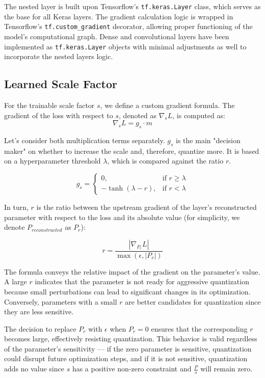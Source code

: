 The nested layer is built upon Tensorflow's \texttt{tf.keras.Layer} class,
which serves as the base for all Keras layers. The gradient calculation logic is wrapped
in Tensorflow's \texttt{tf.custom\_gradient} decorator, allowing proper functioning of the 
model's computational graph. Dense and convolutional layers have been implemented as 
\texttt{tf.keras.Layer} objects with minimal adjustments as well to incorporate the nested layers logic.


\subsection{Learned Scale Factor}
\label{subsec:learnedscalefactor}

\hspace*{1em}For the trainable scale factor \( s \), we define a custom gradient formula. 
The gradient of the loss with respect to \( s \), denoted as \( \nabla_s L \), is computed as:
\[
\nabla_s L = g_s \cdot m
\]

Let's consider both multiplication terms separately. \(  g_s  \) is the main "decision maker" on whether to
increase the scale and, therefore, quantize more. It is based on a hyperparameter threshold  \(  \lambda  \),
which is compared against the ratio \(  r  \).

\[
g_s = 
\begin{cases} 
0, & \text{if } r \geq \lambda \\
- \tanh(\lambda - r), & \text{if } r < \lambda
\end{cases}
\]

In turn, \(  r  \) is the ratio between the upstream gradient of the layer's reconstructed parameter with respect to the loss
and its absolute value (for simplicity, we denote \( P_{reconstructed}\) as \(P_r\)):

\[
r = \frac{\left| \nabla_{P_{r}} L \right|}{\max(\epsilon, \left| P_r \right|)}
\]

The formula conveys the relative impact of the gradient on the parameter's value.
A large \(  r  \) indicates that the parameter is not ready for aggressive quantization
because small perturbations can lead to significant changes in its optimization.
Conversely, parameters with a small \(  r  \) are better candidates
for quantization since they are less sensitive.

The decision to replace \( P_r \) with \( \epsilon \) when \( P_r = 0 \)
ensures that the corresponding \( r \) becomes large,
effectively resisting quantization. This behavior is valid regardless of the parameter's sensitivity
 — if the zero parameter is sensitive, quantization could disrupt future optimization steps,
 and if it is not sensitive, quantization adds no value since \( s \) has a positive non-zero constraint 
 and \( \frac{P}{s} \) will remain zero.

